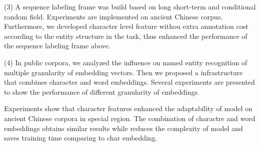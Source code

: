 (3) A sequence labeling frame was build based on long short-term and conditional random field. Experiments are implemented on ancient Chinese corpus. Furthermore, we developed character level feature withou extra annotation cost according to the entity structure in the task, thus enhanced the performance of the sequence labeling frame above.

(4) In public corpora, we analyzed the influence on named entity recognition of multiple granularity of embedding vectors. Then we proposed a infrastructure that combines character and word embeddings. Several experiments are presented to show the performance of different granularity of embeddings.

Experiments show that character features enhanced the adaptability of model on ancient Chinese corpora in special region. The combination of charactre and word embeddings obtains similar results while reduces the complexity of model and saves training time comparing to char embedding.

